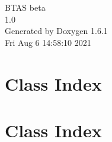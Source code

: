 \documentclass[a4paper]{book}
\begin{document}
\hypersetup{pageanchor=false}
\begin{titlepage}
\vspace*{7cm}
\begin{center}
{\Large BTAS beta \\[1ex]\large 1.0 }\\
\vspace*{1cm}
{\large Generated by Doxygen 1.6.1}\\
\vspace*{0.5cm}
{\small Fri Aug 6 14:58:10 2021}\\
\end{center}
\end{titlepage}
\clearemptydoublepage
{}
\tableofcontents
\clearemptydoublepage
{}
\hypersetup{pageanchor=true}
\chapter{Class Index}

\chapter{Class Index}

\end{document}
